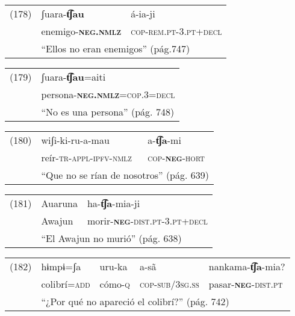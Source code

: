 {\setmainfont{Charis SIL} 

\begin{tabular}{lll}
(178) & ʃuara-\textbf{t͡ʃau} & á-ia-ji \\
& enemigo-\textsc{\textbf{neg.nmlz}} & \textsc{cop-rem.pt-3.pt+decl} \\
& \multicolumn{2}{l}{``Ellos no eran enemigos'' (pág.747)}
\end{tabular} \vspace{0.3cm}

\begin{tabular}{ll}
(179) & ʃuara-\textbf{t͡ʃau}=aiti \\
& persona-\textsc{\textbf{neg.nmlz}=cop.3=decl}\\
& ``No es una persona'' (pág. 748)
\end{tabular} \vspace{0.3cm}

\begin{tabular}{lll}
(180) & wiʃi-ki-ru-a-mau & a-\textbf{t͡ʃa}-mi \\
& reír-\textsc{tr-appl-ipfv-nmlz} & \textsc{cop-\textbf{neg}-hort} \\
& \multicolumn{2}{l}{``Que no se rían de nosotros'' (pág. 639)}
\end{tabular} \vspace{0.3cm}

\begin{tabular}{lll}
(181) & Auaruna & ha-\textbf{t͡ʃa}-mia-ji \\
& Awajun & morir-\textsc{\textbf{neg}-dist.pt-3.pt+decl} \\
& \multicolumn{2}{l}{``El Awajun no murió'' (pág. 638)}
\end{tabular} \vspace{0.3cm}

\begin{tabular}{lllll}
(182) & hɨmpɨ=ʃa & uru-ka & a-sã & nankama-\textbf{t͡ʃa}-mia? \\
& colibrí=\textsc{add} & cómo-\textsc{q} & \textsc{cop-sub/3sg.ss} & pasar-\textsc{\textbf{neg}-dist.pt} \\
& \multicolumn{4}{l}{``¿Por qué no apareció el colibrí?'' (pág. 742)}
\end{tabular} \vspace{0.4cm}

}

